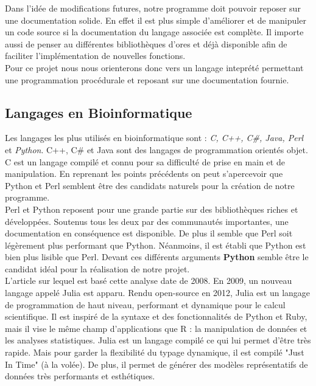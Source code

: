 \documentclass[a4paper]{report}
\begin{document}
Dans l'idée de modifications futures, notre programme doit pouvoir reposer sur une documentation solide. En effet il est plus simple d'améliorer et de manipuler un code source si la documentation du langage associée est complète. Il importe aussi de penser au différentes bibliothèques d'ores et déjà disponible afin de faciliter l'implémentation de nouvelles fonctions.\\

Pour ce projet nous nous orienterons donc vers un langage inteprété permettant une programmation procédurale et reposant sur une documentation fournie.

\subsection*{Langages en Bioinformatique}

Les langages les plus utilisés en bioinformatique\cite{ref3} sont : \textit{C, C++, C\#, Java, Perl} et \textit{Python}. C++, C\# et Java sont des langages de programmation orientés objet. C est un langage compilé et connu pour sa difficulté de prise en main et de manipulation. En reprenant les points précédents on peut s'apercevoir que Python et Perl semblent être des candidats naturels pour la création de notre programme.\\

Perl et Python\cite{ref4} reposent pour une grande partie sur des bibliothèques riches et développées. Soutenus tous les deux par des communautés importantes, une documentation en conséquence est disponible. De plus il semble que Perl soit légèrement plus performant que Python\cite{ref5}. Néanmoins, il est établi que Python est bien plus lisible que Perl. Devant ces différents arguments \textbf{Python} semble être le candidat idéal pour la réalisation de notre projet.\\

L'article\cite{ref3} sur lequel est basé cette analyse date de 2008. En 2009, un nouveau langage appelé Julia\cite{ref6} est apparu. Rendu open-source en 2012, Julia est un langage de programmation de haut niveau, performant et dynamique pour le calcul scientifique. Il est inspiré de la syntaxe et des fonctionnalités de Python et Ruby, mais il vise le même champ d'applications que R : la manipulation de données et les analyses statistiques. Julia est un langage compilé ce qui lui permet d'être très rapide. Mais pour garder la flexibilité du typage dynamique, il est compilé "Just In Time" (à la volée). De plus, il permet de générer des modèles représentatifs de données très performants et esthétiques. \\
\end{document}
